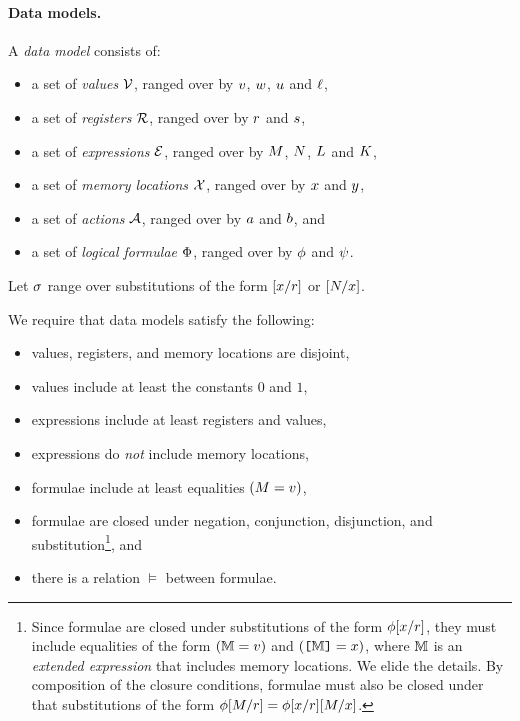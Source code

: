 \paragraph{Data models.}
A \emph{data model} consists of:
\begin{itemize}
\item a set of \emph{values} $\mathcal{V}$, ranged over by
  $v$, $w$, $u$ and $\ell$,
\item a set of \emph{registers} $\mathcal{R}$, ranged over by
  $r$ and $s$,
\item a set of \emph{expressions} $\mathcal{E}$, ranged over by
  $M$, $N$, $L$ and $K$,
\item a set of \emph{memory locations} $\mathcal{X}$, ranged over by $x$ and
  $y$, 
\item a set of \emph{actions} $\mathcal{A}$, ranged over by $a$ and $b$, and
\item a set of \emph{logical formulae} $\Phi$, ranged over by
  $\phi$ and $\psi$.
\end{itemize}

Let $\sigma$ range over substitutions of the form
$[x/r]$ or $[N/x]$.

We require that data models satisfy the following:
\begin{itemize}
\item values, registers, and memory locations are disjoint,
\item values include at least the constants $0$ and $1$,
\item expressions include at least registers and values,
\item expressions do \emph{not} include memory locations, %
\item formulae include at least %
  equalities %
  $(M=v)$, %
\item formulae are closed under negation, conjunction, disjunction, and
  substitution\footnote{Since formulae are closed under substitutions of the
    form $\phi[x/r]$, they must include equalities of the form
    $(\mathbb{M}=v)$ and $(\texttt{[}\mathbb{M}\texttt{]}=x)$, where $\mathbb{M}$ is an
    \emph{extended expression} that includes memory locations.  We elide the
    details.  By composition of the closure conditions, formulae must also be
    closed under that substitutions of the form
    $\phi[M/r]=\phi[x/r][M/x]$.}, and
\item there is a relation $\vDash$ between formulae.
\end{itemize}


